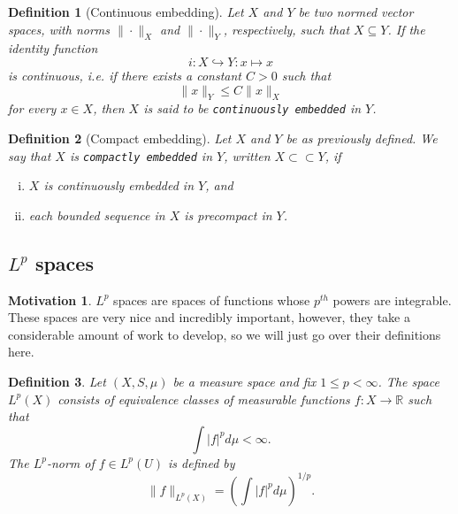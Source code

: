 \documentclass[11pt]{article}
\newtheorem{definition}{Definition}
\theoremstyle{definition}
\newtheorem*{motivation}{Motivation}
\begin{document}
\begin{definition}[Continuous embedding]
	Let $X$ and $Y$ be two normed vector spaces, with norms
	$\|\cdot\|_X$ and $\|\cdot\|_Y$, respectively, such that
	$X \subseteq Y$. If the identity function
	\begin{equation*}
		i : X \hookrightarrow Y : x \mapsto x
	\end{equation*}
	is continuous, i.e. if there exists a constant $C > 0$ such that
	\begin{equation*}
		\|x\|_Y \leq C\|x\|_X
	\end{equation*}
	for every $x \in X$, then $X$ is said to be
	\texttt{continuously embedded} in $Y$.
\end{definition}

\begin{definition}[Compact embedding]
	Let $X$ and $Y$ be as previously defined.
	We say that $X$ is \texttt{compactly embedded} in $Y$, written
	$X \subset\subset Y$, if
	\begin{enumerate}[(i)]
		\item $X$ is continuously embedded in $Y$, and
		\item each bounded sequence in $X$ is precompact in $Y$.
	\end{enumerate}
\end{definition}

\newpage

\subsection{$L^p$ spaces}
\begin{motivation}
	$L^p$ spaces are spaces of functions whose $p^{th}$ powers are integrable.
	These spaces are very nice and incredibly important, however, they take a considerable amount of work to develop,
	so we will just go over their definitions here.
\end{motivation}

\begin{definition}
	Let $(X,S,\mu)$ be a measure space and fix $1 \leq p < \infty$. The space $L^p(X)$ consists of equivalence classes
	of measurable functions $f : X \rightarrow \mathbb{R}$ such that
	\begin{equation*}
		\int |f|^p d\mu < \infty.
	\end{equation*}
	The $L^p$-norm of $f \in L^p(U)$ is defined by
	\begin{equation*}
		\|f\|_{L^p(X)} = \left( \int |f|^p d\mu \right)^{1/p}.
	\end{equation*}
\end{definition}
\end{document}
